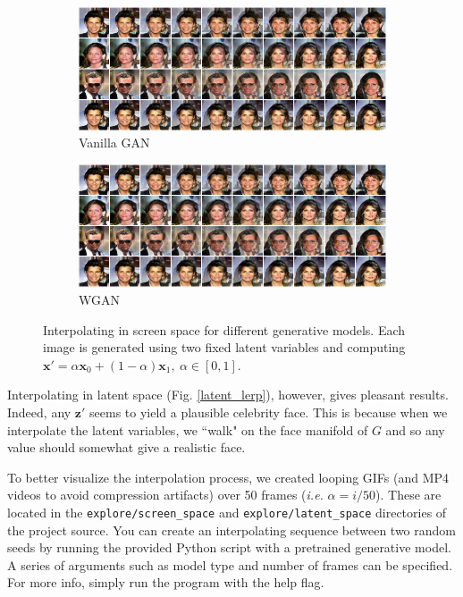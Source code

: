 \documentclass[table]{article}
\def\*#1{\mathbf{#1}}
\newcommand{\code}[1]{{\color{Blue}\small\texttt{#1}}}
\begin{document}
\begin{figure}[ht]
  \centering
  \begin{subfigure}{\textwidth}
    \centering
    \includegraphics[scale=0.5]{imgs/gan_screen_lerp}
    \caption{Vanilla GAN}
  \end{subfigure}

  \vspace*{3mm}
  \begin{subfigure}{\textwidth}
    \centering
    \includegraphics[scale=0.5]{imgs/gan_screen_lerp}
    \caption{WGAN}
  \end{subfigure}
  \caption{Interpolating in screen space for different generative models. Each image is generated using two fixed latent variables and computing $\*x' = \alpha \*x_0 + (1-\alpha)\*x_1, \ \alpha \in [0,1]$.}
  \label{screen_lerp}
\end{figure}

Interpolating in latent space (Fig. \ref{latent_lerp}), however, gives pleasant results. Indeed, any $\*z'$ seems to yield a plausible celebrity face. This is because when we interpolate the latent variables, we ``walk" on the face manifold of $G$ and so any value should somewhat give a realistic face.

To better visualize the interpolation process, we created looping GIFs (and MP4 videos to avoid compression artifacts) over 50 frames (\textit{i.e.} $\alpha = i/50$). These are located in the \code{explore/screen\_space} and \code{explore/latent\_space} directories of the project source. You can create an interpolating sequence between two random seeds by running the provided Python script with a pretrained generative model. A series of arguments such as model type and number of frames can be specified. For more info, simply run the program with the help flag.
\end{document}
